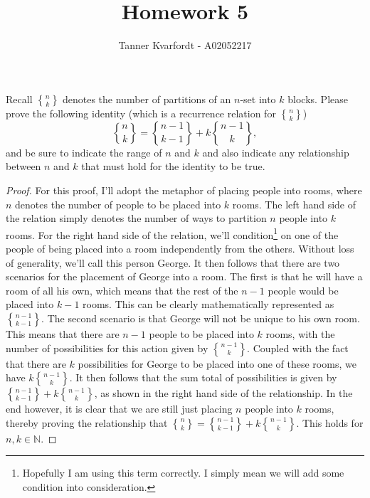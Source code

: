 \documentclass[12pt]{article}
\newcommand{\stirling}[2]{\genfrac{\{}{\}}{0pt}{}{#1}{#2}}
\newenvironment{problem}[2][Problem]{\begin{trivlist}
\item[\hskip \labelsep {\bfseries #1}\hskip \labelsep {\bfseries #2.}]}{\end{trivlist}}
\begin{document}
 
 
\title{Homework 5}
\author{Tanner Kvarfordt - A02052217}
\maketitle
 
\begin{problem}{1}
Recall $\stirling{n}{k}$ denotes the number of partitions of an $n$-set into $k$ blocks.  
Please prove the following  identity (which is a recurrence relation for $\stirling{n}{k}$)
$$\stirling{n}{k} = \stirling{n-1}{k-1} + k\stirling{n-1}{k},$$
and be sure to indicate the range of $n$ and $k$ and also indicate any relationship between $n$ and $k$ that must hold for the identity to be true.
\end{problem}

\begin{proof}
For this proof, I'll adopt the metaphor of placing people into rooms, where $n$ denotes the number of people to be placed into $k$ rooms. The left hand side of the relation simply denotes the number of ways to partition $n$ people into $k$ rooms. For the right hand side of the relation, we'll condition\footnote{Hopefully I am using this term correctly. I simply mean we will add some condition into consideration.} on one of the people of being placed into a room independently from the others. Without loss of generality, we'll call this person George. It then follows that there are two scenarios for the placement of George into a room. The first is that he will have a room of all his own, which means that the rest of the $n-1$ people would be placed into $k-1$ rooms. This can be clearly mathematically represented as $\stirling{n-1}{k-1}$. The second scenario is that George will not be unique to his own room. This means that there are $n-1$ people to be placed into $k$ rooms, with the number of possibilities for this action given by $\stirling{n-1}{k}$. Coupled with the fact that there are $k$ possibilities for George to be placed into one of these rooms, we have $k\stirling{n-1}{k}$. It then follows that the sum total of possibilities is given by $\stirling{n-1}{k-1} + k\stirling{n-1}{k}$, as shown in the right hand side of the relationship. In the end however, it is clear that we are still just placing $n$ people into $k$ rooms, thereby proving the relationship that $\stirling{n}{k} = \stirling{n-1}{k-1} + k\stirling{n-1}{k}$. This holds for $n,k \in\mathbb{N}$.
\end{proof}
\end{document}

